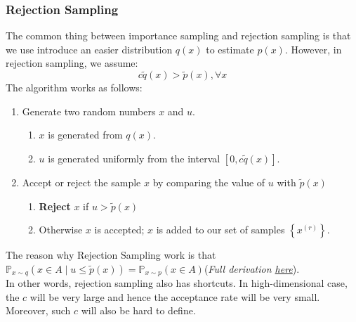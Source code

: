 \subsubsection*{Rejection Sampling}
The common thing between importance sampling and rejection sampling is that we use introduce an easier distribution $q(x)$ to estimate $p(x)$. However, in rejection sampling, we assume:
$$c\tilde{q}(x)>\tilde{p}(x),\forall x$$
The algorithm works as follows:
\begin{enumerate}
    \item Generate two random numbers $x$ and $u$.
    \begin{enumerate}[label=1.\arabic*]
        \item $x$ is generated from $q(x)$.
        \item $u$ is generated uniformly from the interval $[0, c \tilde{q}(x)]$.
    \end{enumerate}
    \item Accept or reject the sample $x$ by comparing the value of $u$ with $\tilde{p}(x)$
    \begin{enumerate}[label=2.\arabic*]
        \item \textbf{Reject} $x$ if $u>\tilde{p}(x)$
        \item Otherwise $x$ is accepted; $x$ is added to our set of samples $\left\{x^{(r)}\right\}$.
    \end{enumerate}
\end{enumerate}
The reason why Rejection Sampling work is that $\mathbb{P}_{x \sim q}(x \in A \mid u \leq \tilde{p}(x))=\mathbb{P}_{x \sim p}(x \in A)$(\textit{Full derivation \hyperref[sec:rejection]{here}}).\\

In other words, rejection sampling also has shortcuts. In high-dimensional case, the $c$ will be very large and hence the acceptance rate will be very small. Moreover, such $c$ will also be hard to define.